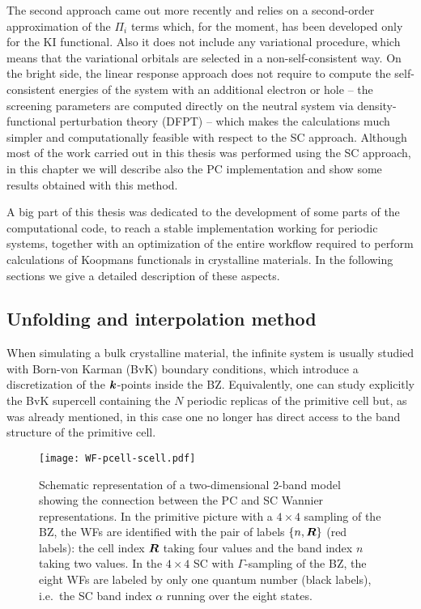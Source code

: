 The second approach came out more recently \cite{colonna_koopmans_2022} and relies on a second-order approximation of the $\Pi_i$ terms which, for the moment, has been developed only for the KI functional. Also it does not include any variational procedure, which means that the variational orbitals are selected in a non-self-consistent way. On the bright side, the linear response approach does not require to compute the self-consistent energies of the system with an additional electron or hole -- the screening parameters are computed directly on the neutral system via density-functional perturbation theory (DFPT) -- which makes the calculations much simpler and computationally feasible with respect to the SC approach. Although most of the work carried out in this thesis was performed using the SC approach, in this chapter we will describe also the PC implementation and show some results obtained with this method.

A big part of this thesis was dedicated to the development of some parts of the computational code, to reach a stable implementation working for periodic systems, together with an optimization of the entire workflow required to perform calculations of Koopmans functionals in crystalline materials. In the following sections we give a detailed description of these aspects.


\subsection{Unfolding and interpolation method\label{sec:unfolding-method}}
When simulating a bulk crystalline material, the infinite system is usually studied with Born-von Karman (BvK) boundary conditions, which introduce a discretization of the ${\bm k}$-points inside the BZ. Equivalently, one can study explicitly the BvK supercell containing the $N$ periodic replicas of the primitive cell but, as was already mentioned, in this case one no longer has direct access to the band structure of the primitive cell.

\begin{figure}
    \centering
    \texttt{[image: WF-pcell-scell.pdf]}
    \caption[Schematic representation of the map connecting PC's and SC's Wannier functions]{Schematic representation of a two-dimensional 2-band model showing the connection between the PC and SC Wannier representations. In the primitive picture with a $4\times 4$ sampling of the BZ, the WFs are identified with the pair of labels $\{ n,{\bm R} \}$ (red labels): the cell index ${\bm R}$ taking four values and the band index $n$ taking two values. In the $4\times 4$ SC with $\Gamma$-sampling of the BZ, the eight WFs are labeled by only one quantum number (black labels), i.e.\ the SC band index $\alpha$ running over the eight states.}
    \label{fig:map-wf}
\end{figure}

